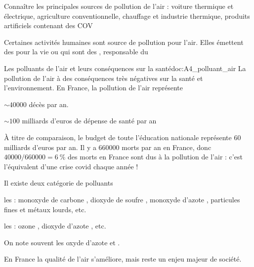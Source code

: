 \teteTermStssEnvi
{}

\begin{objectifs}
  \item Connaître les principales sources de pollution de l'air : voiture thermique et électrique, agriculture conventionnelle, chauffage et industrie thermique, produits artificiels contenant des COV
\end{objectifs}

\begin{contexte}
  Certaines activités humaines sont source de pollution pour l'air.
  Elles émettent des  pour la vie ou qui sont des , responsable du 
  
\end{contexte}


\begin{doc}{Les polluants de l'air et leurs conséquences sur la santé}{doc:A4_polluant_air}
  La pollution de l'air à des conséquences très négatives sur la santé et l'environnement.
  En France, la pollution de l'air représente
  \begin{listePoints}
    \item $\sim \num{40000}$ décès par an.
    \item $\sim 100$ milliards d'euros de dépense de santé par an 
  \end{listePoints}
  À titre de comparaison, le budget de toute l'éducation nationale représente 60 milliards d'euros par an. 
  Il y a \num{660 000} morts par an en France, donc $\num{40000}/\num{660000} = \qty{6}{\percent}$ des morts en France sont dus à la pollution de l'air : c'est l'équivalent d'une crise covid chaque année !

  \begin{importants}
    Il existe deux catégorie de polluants
    \begin{listePoints}
      \item les  : monoxyde de carbone , dioxyde de soufre , monoxyde d'azote , particules fines et métaux lourds, etc.
      \item les  : ozone , dioxyde d'azote , etc.
    \end{listePoints}
    On note souvent  les oxyde d'azote  et .
  \end{importants}
  
  En France la qualité de l'air s'améliore, mais reste un enjeu majeur de société.

  \begin{center}
  \end{center}
\end{doc}


